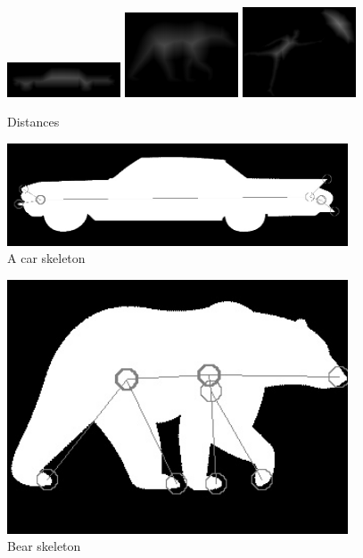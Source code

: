 \documentclass{article}
\begin{document}
\begin{figure}
            \includegraphics[width=0.3\textwidth]{card}
            \includegraphics[width=0.3\textwidth]{beard}
            \includegraphics[width=0.3\textwidth]{umbd}
           
  \caption{Distances}
\end{figure}

\begin{figure}
            \includegraphics[width=0.9\textwidth]{carskelly}
  \caption{A car skeleton}
\end{figure}

\begin{figure}
            \includegraphics[width=0.9\textwidth]{bearskelly}
  \caption{Bear skeleton}
\end{figure}
\end{document}
